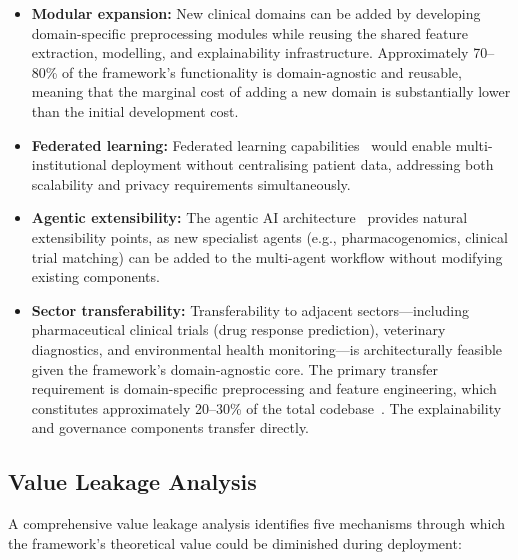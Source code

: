 \begin{itemize}[leftmargin=*, itemsep=3pt]
    \item \textbf{Modular expansion:} New clinical domains can be added by developing domain-specific preprocessing modules while reusing the shared feature extraction, modelling, and explainability infrastructure. Approximately 70--80\% of the framework's functionality is domain-agnostic and reusable, meaning that the marginal cost of adding a new domain is substantially lower than the initial development cost.
    \item \textbf{Federated learning:} Federated learning capabilities~\cite{rieke2020federated, sheller2020federated} would enable multi-institutional deployment without centralising patient data, addressing both scalability and privacy requirements simultaneously.
    \item \textbf{Agentic extensibility:} The agentic AI architecture~\cite{wang2024agentai} provides natural extensibility points, as new specialist agents (e.g., pharmacogenomics, clinical trial matching) can be added to the multi-agent workflow without modifying existing components.
    \item \textbf{Sector transferability:} Transferability to adjacent sectors---including pharmaceutical clinical trials (drug response prediction), veterinary diagnostics, and environmental health monitoring---is architecturally feasible given the framework's domain-agnostic core. The primary transfer requirement is domain-specific preprocessing and feature engineering, which constitutes approximately 20--30\% of the total codebase~\cite{hosny2018radiomics}. The explainability and governance components transfer directly.
\end{itemize}

\subsection{Value Leakage Analysis}

A comprehensive value leakage analysis identifies five mechanisms through which the framework's theoretical value could be diminished during deployment:

